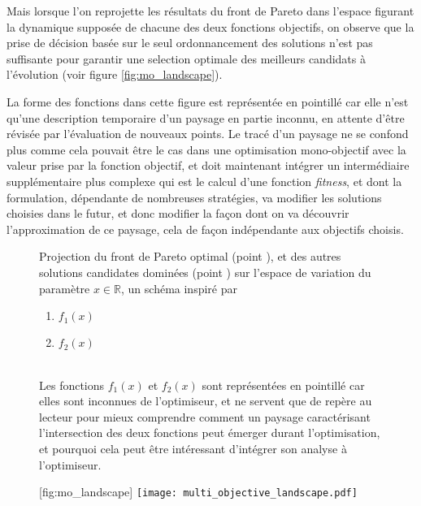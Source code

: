 Mais lorsque l'on reprojette les résultats du front de Pareto dans l'espace figurant la dynamique supposée de chacune des deux fonctions objectifs, on observe que la prise de décision basée sur le seul ordonnancement des solutions n'est pas suffisante pour garantir une selection optimale des meilleurs candidats à l'évolution (voir figure \ref{fig:mo_landscape}). 

La forme des fonctions dans cette figure est représentée en pointillé car elle n'est qu'une description temporaire d'un paysage en partie inconnu, en attente d'être révisée par l'évaluation de nouveaux points. Le tracé d'un paysage ne se confond plus comme cela pouvait être le cas dans une optimisation mono-objectif avec la valeur prise par la fonction objectif, et doit maintenant intégrer un intermédiaire supplémentaire plus complexe qui est le calcul d'une fonction \textit{fitness}, et dont la formulation, dépendante de nombreuses stratégies, va modifier les solutions choisies dans le futur, et donc modifier la façon dont on va découvrir l'approximation de ce paysage, cela de façon indépendante aux objectifs choisis. \autocite{Weise2011}

\begin{figure}[!htbp]
	\begin{sidecaption}[fortoc]{Projection du front de Pareto optimal (point ), et des autres solutions candidates dominées (point ) sur l'espace de variation du paramètre $x \in \mathbb{R}$, un schéma inspiré par \textcite[67]{Weise2011}
	\parbox{\marginparwidth}{
	\begin{enumerate}[label={},labelindent=0pt,leftmargin=*]
	      \item {} $f_{1}(x)$
	      \item {} $f_{2}(x)$
	\end{enumerate}}\\
	Les fonctions $f_{1}(x)$ et $f_{2}(x)$ sont représentées en pointillé car elles sont inconnues de l'optimiseur, et ne servent que de repère au lecteur pour mieux comprendre comment un paysage caractérisant l'intersection des deux fonctions peut émerger durant l'optimisation, et pourquoi cela peut être intéressant d'intégrer son analyse à l'optimiseur.}[fig:mo_landscape]
	 \centering
	 	\texttt{[image: multi\_objective\_landscape.pdf]}
	\end{sidecaption}
\end{figure}


